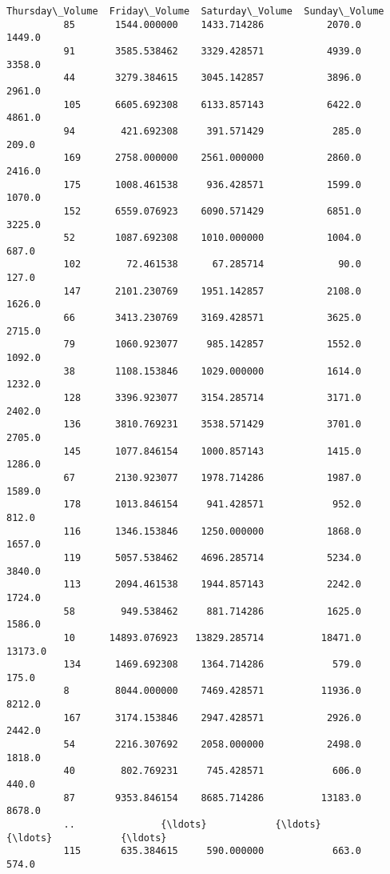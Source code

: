 \documentclass[11pt]{article}
\begin{document}
\begin{Verbatim}[commandchars=\\\{\}]
               Thursday\_Volume  Friday\_Volume  Saturday\_Volume  Sunday\_Volume  
          85       1544.000000    1433.714286           2070.0         1449.0  
          91       3585.538462    3329.428571           4939.0         3358.0  
          44       3279.384615    3045.142857           3896.0         2961.0  
          105      6605.692308    6133.857143           6422.0         4861.0  
          94        421.692308     391.571429            285.0          209.0  
          169      2758.000000    2561.000000           2860.0         2416.0  
          175      1008.461538     936.428571           1599.0         1070.0  
          152      6559.076923    6090.571429           6851.0         3225.0  
          52       1087.692308    1010.000000           1004.0          687.0  
          102        72.461538      67.285714             90.0          127.0  
          147      2101.230769    1951.142857           2108.0         1626.0  
          66       3413.230769    3169.428571           3625.0         2715.0  
          79       1060.923077     985.142857           1552.0         1092.0  
          38       1108.153846    1029.000000           1614.0         1232.0  
          128      3396.923077    3154.285714           3171.0         2402.0  
          136      3810.769231    3538.571429           3701.0         2705.0  
          145      1077.846154    1000.857143           1415.0         1286.0  
          67       2130.923077    1978.714286           1987.0         1589.0  
          178      1013.846154     941.428571            952.0          812.0  
          116      1346.153846    1250.000000           1868.0         1657.0  
          119      5057.538462    4696.285714           5234.0         3840.0  
          113      2094.461538    1944.857143           2242.0         1724.0  
          58        949.538462     881.714286           1625.0         1586.0  
          10      14893.076923   13829.285714          18471.0        13173.0  
          134      1469.692308    1364.714286            579.0          175.0  
          8        8044.000000    7469.428571          11936.0         8212.0  
          167      3174.153846    2947.428571           2926.0         2442.0  
          54       2216.307692    2058.000000           2498.0         1818.0  
          40        802.769231     745.428571            606.0          440.0  
          87       9353.846154    8685.714286          13183.0         8678.0  
          ..               {\ldots}            {\ldots}              {\ldots}            {\ldots}  
          115       635.384615     590.000000            663.0          574.0  

\end{Verbatim}
\end{document}
